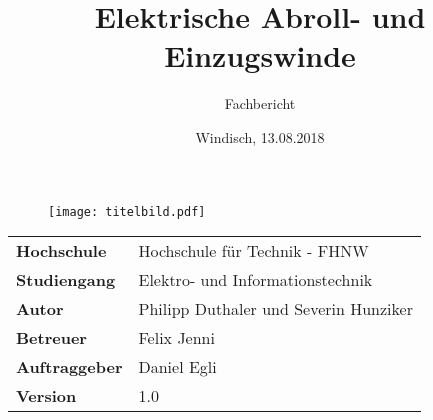 \documentclass[final]{fhnwreport}       %
\title{Elektrische Abroll- und Einzugswinde}          %
\author{Fachbericht}          %
\date{Windisch, 13.08.2018}             %
\begin{document}
\maketitle

\vspace*{-1cm}						    %
\vfill
\begin{figure}[H]
\centering
\texttt{[image: titelbild.pdf]}
\end{figure}
\vfill

{
\renewcommand\arraystretch{2}
\begin{center}
\begin{tabular}{>{\bf}p{4cm} l}
Hochschule                 &    Hochschule für Technik - FHNW\\
Studiengang                &    Elektro- und Informationstechnik\\
Autor   		           & 	Philipp Duthaler und Severin Hunziker\\
Betreuer                   &    Felix Jenni\\
Auftraggeber               &    Daniel Egli\\
Version                    &    1.0 %
\end{tabular}
\end{center}
}

\clearpage
			
\thispagestyle{empty}


\tableofcontents
\clearpage









{\sloppypar
\printbibliography[heading=bibintoc]
\label{sec:lit}
\printbibliography[heading=bibintoc]
}



{%
}
\end{document}
